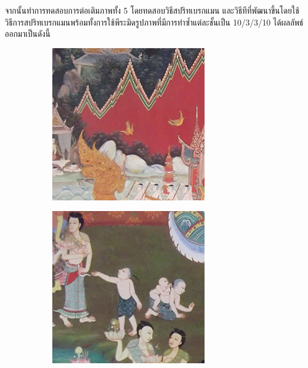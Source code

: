 \hspace{1cm} จากนั้นทำการทดสอบการต่อเติมภาพทั้ง 5 โดยทดสอบวิธีสปริทเบรกแมน และวิธีทีที่พัฒนาขึ้นโดยใช้วิธีการสปริทเบรกแมนพร้อมทั้งการใช้พีระมิดรูปภาพที่มีการทำซ้ำแต่ละชั้นเป็น 10/3/3/10  ได้ผลลัพธ์ออกมาเป็นดังนี้
	\begin{figure}[H]
		\centering
		\begin{subfigure}{0.4\linewidth}
			\centering
			\includegraphics[width=0.8\linewidth]{image/result_ex4/splitbergman_case01.png}
		\end{subfigure}
		\begin{subfigure}{0.4\linewidth}
			\centering
			\includegraphics[width=0.8\linewidth]{image/result_ex4/splitbergman_case02.png}

\end{subfigure}
\end{figure}
